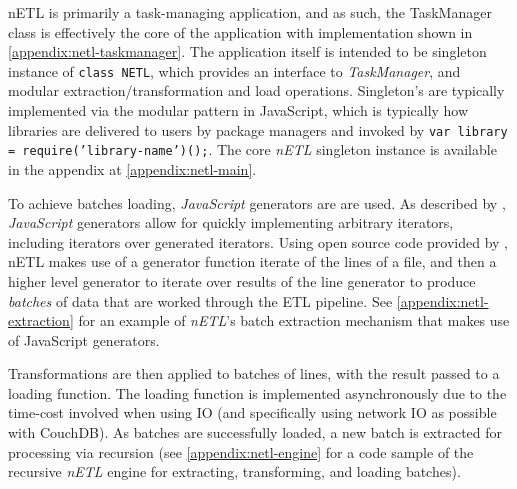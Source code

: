 nETL is primarily a task-managing application, and as such, the TaskManager class is effectively the core of the application with implementation shown in \ref{appendix:netl-taskmanager}. The application itself is intended to be singleton instance of \texttt{class NETL{}}, which provides an interface to \textit{TaskManager}, and modular extraction/transformation and load operations. Singleton's are typically implemented via the modular pattern in JavaScript, which is typically how libraries are delivered to users by package managers and invoked by \texttt{var library = require('library-name')();}. The core \textit{nETL} singleton instance is available in the appendix at \ref{appendix:netl-main}.

To achieve batches loading, \textit{JavaScript} generators are are used. As described by \cite{mozillaGenerators}, \textit{JavaScript} generators allow for quickly implementing arbitrary iterators, including iterators over generated iterators. Using open source code provided by \cite{bower16}, nETL makes use of a generator function iterate of the lines of a file, and then a higher level generator to iterate over results of the line generator to produce \textit{batches} of data that are worked through the ETL pipeline. See \ref{appendix:netl-extraction} for an example of \textit{nETL}'s batch extraction mechanism that makes use of JavaScript generators.

Transformations are then applied to batches of lines, with the result passed to a loading function. The loading function is implemented asynchronously due to the time-cost involved when using IO (and specifically using network IO as possible with CouchDB). As batches are successfully loaded, a new batch is extracted for processing via recursion (see \ref{appendix:netl-engine} for a code sample of the recursive \textit{nETL} engine for extracting, transforming, and loading batches).